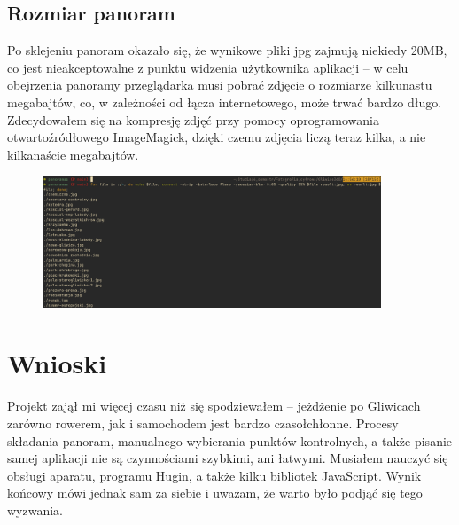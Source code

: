 \documentclass[a4paper]{mwart}
\begin{document}
\subsection{Rozmiar panoram}
Po sklejeniu panoram okazało się, że wynikowe pliki jpg zajmują niekiedy 20MB,
co jest nieakceptowalne z punktu widzenia użytkownika aplikacji -- w celu
obejrzenia panoramy przeglądarka musi pobrać zdjęcie o rozmiarze kilkunastu
megabajtów, co, w zależności od łącza internetowego, może trwać bardzo długo.
Zdecydowałem się na kompresję zdjęć przy pomocy oprogramowania otwartoźródłowego
ImageMagick, dzięki czemu zdjęcia liczą teraz kilka, a nie kilkanaście
megabajtów.
\begin{figure}[H]
\centering
\includegraphics[width=0.9\textwidth]{images/convert.jpg}
\end{figure}

\section{Wnioski}
Projekt zajął mi więcej czasu niż się spodziewałem -- jeżdżenie po Gliwicach 
zarówno rowerem, jak i samochodem jest bardzo czasołchłonne. Procesy składania
panoram, manualnego wybierania punktów kontrolnych, a także pisanie samej
aplikacji nie są czynnościami szybkimi, ani łatwymi. Musiałem nauczyć się
obsługi aparatu, programu Hugin, a także kilku bibliotek JavaScript.
Wynik końcowy mówi jednak sam za siebie i uważam, że warto było podjąć się tego
wyzwania.
\end{document}
